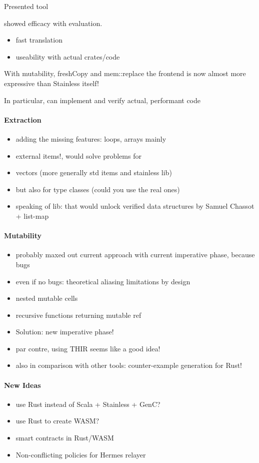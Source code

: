 Presented tool

showed efficacy with evaluation.
\begin{itemize}
\tightlist
\item fast translation
\item useability with actual crates/code
\end{itemize}

With mutability, freshCopy and mem::replace the frontend is now almost more
expressive than Stainless itself!

In particular, can implement and verify actual, performant code


\paragraph{Extraction}
\begin{itemize}
\tightlist
\item adding the missing features: loops, arrays mainly

\item   external items!, would solve problems for
\item vectors (more generally std items and stainless lib)
\item but also for type classes (could you use the real ones)

\item speaking of lib: that would unlock verified data structures by Samuel Chassot + list-map
\end{itemize}


\paragraph{Mutability}
\begin{itemize}
\tightlist
\item probably maxed out current approach with current imperative phase,
  because bugs

\item even if no bugs: theoretical aliasing limitations by design
\item nested mutable cells
\item recursive functions returning mutable ref

\item Solution: new imperative phase!

\item par contre, using THIR seems like a good idea!

\item also in comparison with other tools: counter-example generation for Rust!
\end{itemize}


\paragraph{New Ideas}
\begin{itemize}
\tightlist
\item
  use Rust instead of Scala + Stainless + GenC?
\item
  use Rust to create WASM?
\item
  smart contracts in Rust/WASM
\item
  Non-conflicting policies for Hermes relayer
\end{itemize}
